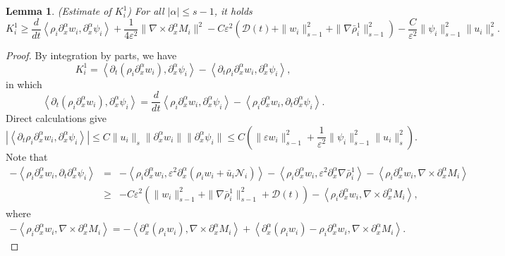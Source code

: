 \documentclass[reqno,twoside,12pt,a4paper]{amsart}
\newcommand{\eps}{\mathbb{\varepsilon}}
\newcommand{\al}{\alpha}
\newcommand{\pa}{\partial}
\newcommand{\Ni}{\mathcal{N}_i}
\newtheorem{lemma}{Lemma}[section]
\numberwithin{equation}{section}
\begin{document}
\begin{lemma}\label{lemma4.2}(Estimate of $K_i^1$)
For all $|\alpha| \leq s-1$, it holds
\begin{equation}\label{4.35}
     K_i^1 \geq \frac{d}{dt} \left\langle \rho_i \partial^\al_x w_i, \partial^\al_x \psi_i \right\rangle+\frac{1}{4\eps^2} \|\nabla \times \partial^\al_x M_i\|^2-C\eps^2(\mathcal{D}(t)+\|w_i\|_{s-1}^2+\|\nabla \bar{\rho}_i^1\|_{s-1}^2)-\frac{C}{\eps^2}\|\psi_i\|^2_{s-1}\|u_i\|^2_{s}.
\end{equation}
\end{lemma}
\begin{proof}
By integration by parts, we have
\[
K_i^1 = \left\langle \partial_t(\rho_i \partial^\al_x w_i), \partial^\al_x \psi_i \right\rangle - \left\langle \partial_t \rho_i \partial^\al_x w_i, \partial^\al_x \psi_i \right\rangle,
\]
in which 
\[
\left\langle \partial_t(\rho_i \partial^\al_x w_i), \partial^\al_x \psi_i \right\rangle= \frac{d}{dt} \left\langle \rho_i \partial^\al_x w_i, \partial^\al_x \psi_i \right\rangle - \left\langle \rho_i \partial^\al_x w_i, \partial_t \partial^\al_x \psi_i \right\rangle.
\]
Direct calculations give
\begin{equation*}
    \left|\left\langle \partial_t \rho_i \partial^\al_x w_i, \partial^\al_x \psi_i \right\rangle\right| \leq C\|u_i\|_{s}\|\pa_x^\al w_i\|\|\pa_x^\al \psi_i\|\leq C(\|\eps w_i\|_{s-1}^2+\frac{1}{\eps^2} \|\psi_i\|^2_{s-1}\|u_i\|^2_{s}).
\end{equation*}
Note that
\begin{eqnarray*}
   -\left\langle \rho_i \partial^\al_x w_i, \partial_t \partial^\al_x \psi_i \right\rangle &=& - \left\langle \rho_i \partial^\al_x w_i, \eps^2 \partial^\al_x(\rho_i w_i +\bar{u}_i \Ni) \right\rangle - \left\langle \rho_i \partial^\al_x w_i, \eps^2\partial^\al_x \nabla \bar{\rho}_i^1 \right\rangle - \left\langle \rho_i \partial^\al_x w_i, \nabla \times \partial^\al_x M_i \right\rangle\nonumber\\
   &\geq & -C\eps^2(\|w_i\|_{s-1}^2+\|\nabla \bar{\rho}_i^1\|_{s-1}^2 + \mathcal{D}(t))- \left\langle \rho_i \partial^\al_x w_i, \nabla \times \partial^\al_x M_i \right\rangle,
\end{eqnarray*}
where
\begin{equation*}
\begin{aligned}
-\left\langle \rho_i \partial^\al_x w_i, \nabla \times \partial^\al_x M_i \right\rangle = - \left\langle \partial^\al_x (\rho_i w_i), \nabla \times \partial^\al_x M_i \right\rangle+\left\langle \partial^\al_x (\rho_i w_i)-\rho_i \partial^\al_x w_i, \nabla \times \partial^\al_x M_i \right\rangle.

\end{aligned}
\end{equation*}
\end{proof}
\end{document}
